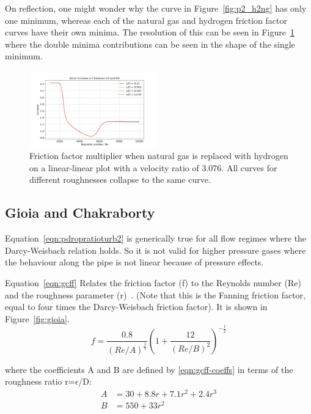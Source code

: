 \documentclass[5p]{elsarticle} %
\begin{document}
On reflection, one might wonder why the curve in Figure~\ref{fig:p2_h2ng} has only one minimum, whereas each of the natural gas and hydrogen friction factor curves have their own minima. The resolution of this can be seen in Figure~\ref{fig:h2ng_enlarge} where the double minima contributions can be seen in the shape of the single minimum. 

\begin{figure}[htb]
\centering
\includegraphics[width=0.49\textwidth]{h2_ratio_enlarge_lin.png}
\caption{Friction factor multiplier when natural gas is replaced with hydrogen on a linear-linear plot with a velocity ratio of 3.076. All curves for different roughnesses collapse to the same curve.}
\label{fig:h2ng_enlarge}
\end{figure}

\subsection{Gioia and Chakraborty}
\label{gioia}

Equation~\ref{eqn:pdropratioturb2} is generically true for all flow regimes where the Darcy-Weisbach relation holds. So it is not valid for higher pressure gases where the behaviour along the pipe is not linear because of pressure effects.

Equation~\ref{eqn:gcff} Relates the friction factor (f) to the Reynolds number (Re) and the roughness parameter (r)~\citep{Gioia2006}. (Note that this is the Fanning friction factor, equal to four times the Darcy-Weisbach friction factor). It is shown in Figure~\ref{fig:gioia}.
\begin{equation}
\label{eqn:gcff}
f = \frac{0.8}{\left(Re/A \right)^{\frac{1}{3}}} \left( 1 + \frac{12}{\left(Re/B \right)^2} \right)^{-\frac{1}{2}}
\end{equation}

where the coefficients A and B are defined by \ref{eqn:gcff-coeffs} in terms of the roughness ratio r=$\epsilon$/D:
\begin{equation}
\label{eqn:gcff-coeffs}
\begin{split}
A & = 30 + 8.8 r + 7.1 r^2 + 2.4 r^3 \\
B & = 550 + 33 r^2
\end{split}
\end{equation}
\end{document}
